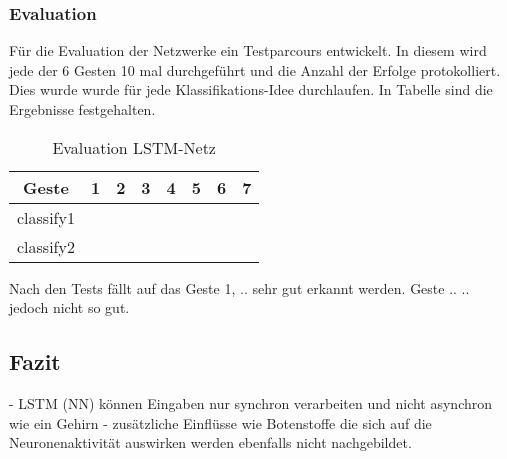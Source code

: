 \subsubsection{Evaluation}
Für die Evaluation der Netzwerke ein Testparcours entwickelt. In diesem wird 
jede der 6 Gesten 10 mal durchgeführt und die Anzahl der Erfolge protokolliert. 
Dies wurde wurde für jede Klassifikations-Idee durchlaufen. In Tabelle 
\cite{tab:eval} sind die Ergebnisse festgehalten.
\begin{table}
\begin{tabular}{|c|c|c|c|c|c|c|c|}
\hline
 Geste 		& 1 & 2 & 3 & 4 & 5 & 6 & 7 \\
 \hline
 classify1  &	&	&	&	&	&	&	\\
 \hline
 classify2  &	&	&	&	&	&	&	\\
\hline
\end{tabular}
\caption{Evaluation LSTM-Netz}
\label{tab:eval}
\end{table}

Nach den Tests fällt auf das Geste 1, .. sehr gut erkannt werden. Geste .. ..
jedoch nicht so gut.
\subsection{Fazit}
- LSTM (NN) können Eingaben nur synchron verarbeiten und nicht asynchron wie ein
Gehirn
- zusätzliche Einflüsse wie Botenstoffe die sich auf die Neuronenaktivität
auswirken werden ebenfalls nicht nachgebildet. 

\nocite{schaul2010,GERS2001,WIKI2013,Schmidhuber2013,LSTM1,Nerbonne1}
